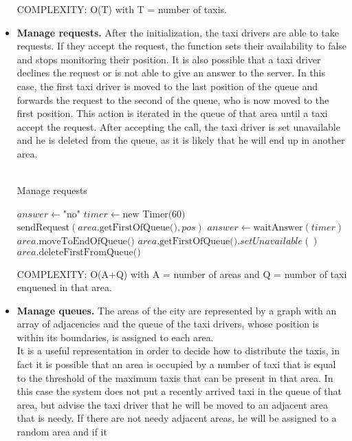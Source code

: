 \documentclass[18pt,oneside,a4paper, titlepage]{article}
\begin{document}
\begin{itemize}
			COMPLEXITY: O(T) with T = number of taxis.
			\newpage
			\item \textbf{Manage requests.} After the initialization, the taxi drivers are able to take requests. If they accept the request, the function sets their availability to false and stops monitoring their position. It is also possible that a taxi driver declines the request or is not able to give an answer to the server. In this case, the first taxi driver is moved to the last position of the queue and forwards the request to the second of the queue, who is now moved to the first position. This action is iterated in the queue of that area until a taxi accept the request. After accepting the call, the taxi driver is set unavailable and he is deleted from the queue, as it is likely that he will end up in another area.\\
			 \\
			
				\begin{algorithm}
					\caption{Manage requests}
					\begin{algorithmic}[1]
						\State $answer \gets \text{"no"}$
						\State $timer \gets \text{new Timer(60)}$
							\State $\text{sendRequest}(area.\text{getFirstOfQueue()}, pos)$
							\State $answer \gets \text{waitAnswer}(timer)$
								\State $area.\text{moveToEndOfQueue()}$
							\EndIf
						\EndWhile
						\State $area.\text{getFirstOfQueue()}.setUnavailable()$
						\State $area.\text{deleteFirstFromQueue()}$
						\EndProcedure
					\end{algorithmic}
				\end{algorithm}
			COMPLEXITY: O(A+Q) with A = number of areas and Q = number of taxi enqueued in that area.
			\newpage
			\item \textbf{Manage queues.} The areas of the city are represented by a graph with an array of adjacencies and the queue of the taxi drivers, whose position is within its boundaries, is assigned to each area.\\ It is a useful representation in order to decide how to distribute the taxis, in fact it is possible that an area is occupied by a number of taxi that is equal to the threshold of the maximum taxis that can be present in that area. In this case the system does not put a recently arrived taxi in the queue of that area, but advise the taxi driver that he will be moved to an adjacent area that is needy. If there are not needy adjacent areas, he will be assigned to a random area and if it \\
			

\end{itemize}
\end{document}
